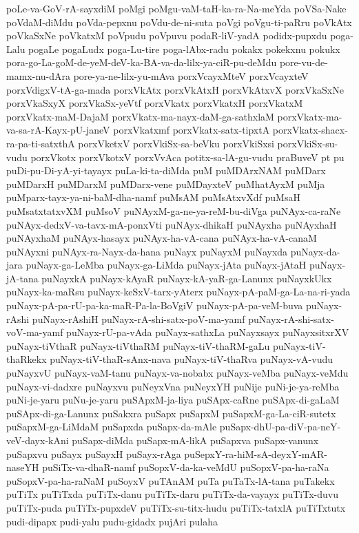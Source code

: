 {poLe-va-GoV-rA-sayxdiM
poMgi
poMgu-vaM-taH-ka-ra-Na-meYda
poVSa-Nake
poVdaM-diMdu
poVda-pepxnu
poVdu-de-ni-suta
poVgi
poVgu-ti-paRru
poVkAtx
poVkaSxNe
poVkatxM
poVpudu
poVpuvu
podaR-liV-yadA
podidx-pupxdu
poga-Lalu
pogaLe
pogaLudx
poga-Lu-tire
poga-lAbx-radu
pokakx
pokekxnu
pokukx
pora-go-La-goM-de-yeM-deV-ka-BA-va-da-lilx-ya-ciR-pu-deMdu
pore-vu-de-mamx-nu-dAra
pore-ya-ne-lilx-yu-mAva
porxVcayxMteV
porxVcayxteV
porxVdigxV-tA-ga-mada
porxVkAtx
porxVkAtxH
porxVkAtxvX
porxVkaSxNe
porxVkaSxyX
porxVkaSx-yeVtf
porxVkatx
porxVkatxH
porxVkatxM
porxVkatx-maM-DajaM
porxVkatx-ma-nayx-daM-ga-sathxlaM
porxVkatx-ma-va-sa-rA-Kayx-pU-janeV
porxVkatxmf
porxVkatx-satx-tipxtA
porxVkatx-shacx-ra-pa-ti-satxthA
porxVketxV
porxVkiSx-sa-beVku
porxVkiSxsi
porxVkiSx-su-vudu
porxVkotx
porxVkotxV
porxVvAca
potitx-sa-lA-gu-vudu
praBuveV
pt
pu
puDi-pu-Di-yA-yi-tayayx
puLa-ki-ta-diMda
puM
puMDArxNAM
puMDarx
puMDarxH
puMDarxM
puMDarx-vene
puMDayxteV
puMhatAyxM
puMja
puMparx-tayx-ya-ni-baM-dha-namf
puMsAM
puMsAtxvXdf
puMsaH
puMsatxtatxvXM
puMsoV
puNAyxM-ga-ne-ya-reM-bu-diVga
puNAyx-ca-raNe
puNAyx-dedxV-va-tavx-mA-ponxVti
puNAyx-dhikaH
puNAyxha
puNAyxhaH
puNAyxhaM
puNAyx-hasayx
puNAyx-ha-vA-cana
puNAyx-ha-vA-canaM
puNAyxni
puNAyx-ra-Nayx-da-hana
puNayx
puNayxM
puNayxda
puNayx-da-jara
puNayx-ga-LeMba
puNayx-ga-LiMda
puNayx-jAta
puNayx-jAtaH
puNayx-jA-tana
puNayxkA
puNayx-kAyaR
puNayx-kA-yaR-ga-Lanunx
puNayxkUkx
puNayx-ka-maRsu
puNayx-keSxV-tarx-yAterx
puNayx-pA-paM-ga-La-na-ri-yada
puNayx-pA-pa-rU-pa-ka-maR-Pa-la-BoVgiV
puNayx-pA-pa-veM-buva
puNayx-rAshi
puNayx-rAshiH
puNayx-rA-shi-satx-poV-ma-yamf
puNayx-rA-shi-satx-voV-ma-yamf
puNayx-rU-pa-vAda
puNayx-sathxLa
puNayxsayx
puNayxsitxrXV
puNayx-tiVthaR
puNayx-tiVthaRM
puNayx-tiV-thaRM-gaLu
puNayx-tiV-thaRkekx
puNayx-tiV-thaR-sAnx-nava
puNayx-tiV-thaRva
puNayx-vA-vudu
puNayxvU
puNayx-vaM-tanu
puNayx-va-nobabx
puNayx-veMba
puNayx-veMdu
puNayx-vi-dadxre
puNayxvu
puNeyxVna
puNeyxYH
puNije
puNi-je-ya-reMba
puNi-je-yaru
puNu-je-yaru
puSApxM-ja-liya
puSApx-caRne
puSApx-di-gaLaM
puSApx-di-ga-Lanunx
puSakxra
puSapx
puSapxM
puSapxM-ga-La-ciR-sutetx
puSapxM-ga-LiMdaM
puSapxda
puSapx-da-mAle
puSapx-dhU-pa-diV-pa-neY-veV-dayx-kAni
puSapx-diMda
puSapx-mA-likA
puSapxva
puSapx-vanunx
puSapxvu
puSayx
puSayxH
puSayx-rAga
puSepxY-ra-hiM-sA-deyxY-mAR-naseYH
puSiTx-va-dhaR-namf
puSopxV-da-ka-veMdU
puSopxV-pa-ha-raNa
puSopxV-pa-ha-raNaM
puSoyxV
puTAnAM
puTa
puTaTx-lA-tana
puTakekx
puTiTx
puTiTxda
puTiTx-danu
puTiTx-daru
puTiTx-da-vayayx
puTiTx-duvu
puTiTx-puda
puTiTx-pupxdeV
puTiTx-su-titx-hudu
puTiTx-tatxlA
puTiTxtutx
pudi-dipapx
pudi-yalu
pudu-gidadx
pujAri
pulaha
}
